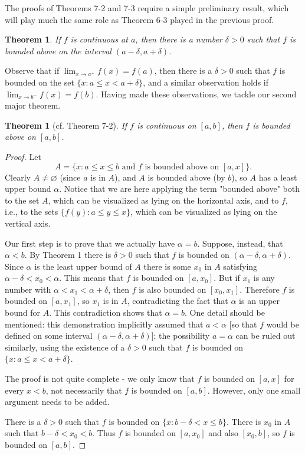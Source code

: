 \documentclass{article}
\numberwithin{definition}{subsection}
\numberwithin{lemma}{subsection}
\newtheorem{theorem}{Theorem}
\numberwithin{theorem}{subsection}
\newtheorem*{theorem*}{Theorem}
\begin{document}
The proofs of Theorems 7-2 and 7-3 require a simple preliminary
result, which will play much the same role as Theorem 6-3 played in the
previous proof.

\begin{theorem}
  If $f$ is continuous at $a$, then there is a number $\delta > 0$ such that
  $f$ is bounded above on the interval $(a - \delta, a + \delta)$.
\end{theorem}

Observe that if $\lim_{x \to a^+} f(x) = f(a)$, then there is a $\delta > 0$
such that $f$ is bounded on the set $\{x: a \leq x < a + \delta\}$, and a
similar observation holds if $\lim_{x \to b^-} f(x) = f(b)$. Having made these
observations, we tackle our second major theorem.

\begin{theorem*}[cf. Theorem 7-2]
  If $f$ is continuous on $[a, b]$, then $f$ is bounded above on $[a, b]$.
\end{theorem*}
\begin{proof}
  Let \[
    A = \{x: a \leq x \leq b \text{ and } f \text{ is bounded above on } [a,
      x]\}.
  \] Clearly $A \neq \varnothing$ (since $a$ is in $A$), and $A$ is bounded
  above (by $b$), so $A$ has a least upper bound $\alpha$. Notice that we are
  here applying the term "bounded above" both to the set $A$, which can be
  visualized as lying on the horizontal axis, and to $f$, i.e., to the sets
  $\{f(y): a \leq y \leq x\}$, which can be visualized as lying on the vertical
  axis.

  Our first step is to prove that we actually have $\alpha = b$. Suppose,
  instead, that $\alpha < b$. By Theorem 1 there is $\delta > 0$ such that $f$
  is bounded on $(\alpha - \delta, \alpha + \delta)$. Since $\alpha$ is the
  least upper bound of $A$ there is some $x_0$ in $A$ satisfying $\alpha -
  \delta < x_0 < \alpha$. This means that $f$ is bounded on $[a, x_0]$. But if
  $x_1$ is any number with $\alpha < x_1 < \alpha + \delta$, then $f$ is also
  bounded on $[x_0, x_1]$. Therefore $f$ is bounded on $[a, x_1]$, so $x_1$ is
  in $A$, contradicting the fact that $\alpha$ is an upper bound for $A$. This
  contradiction shows that $\alpha = b$. One detail should be mentioned: this
  demonstration implicitly assumed that $a < \alpha$ [so that $f$ would be
  defined on some interval $(\alpha - \delta, \alpha + \delta)$]; the
  possibility $a = \alpha$ can be ruled out similarly, using the existence of a
  $\delta > 0$ such that $f$ is bounded on $\{x: a \leq x < a + \delta\}$.

  The proof is not quite complete - we only know that $f$ is bounded on $[a,
  x]$ for every $x < b$, not necessarily that $f$ is bounded on $[a, b]$.
  However, only one small argument needs to be added.

  There is a $\delta > 0$ such that $f$ is bounded on $\{x: b - \delta < x \leq
  b\}$. There is $x_0$ in $A$ such that $b - \delta < x_0 < b$. Thus $f$ is
  bounded on $[a, x_0]$ and also $[x_0, b]$, so $f$ is bounded on $[a, b]$.
\end{proof}
\end{document}
